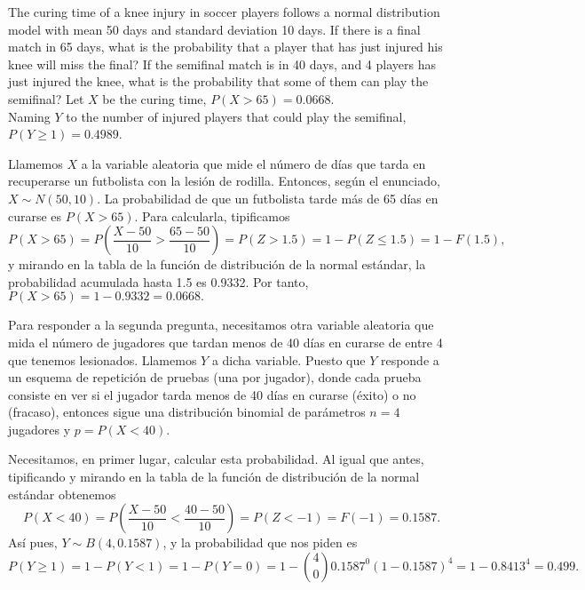 {The curing time of a knee injury in soccer players follows a normal distribution model with mean 50 days and standard deviation 10 days.
If there is a final match in 65 days, what is the probability that a player that has just injured his knee will miss the final?
If the semifinal match is in 40 days, and 4 players has just injured the knee, what is the probability that some of them can play the semifinal?
}
{Let $X$ be the curing time, $P(X>65)=0.0668$.\\
Naming $Y$ to the number of injured players that could play the semifinal, $P(Y\geq 1)=0.4989$.
}
{Llamemos $X$ a la variable aleatoria que mide el número de días que tarda en recuperarse un futbolista con la lesión de rodilla. Entonces,
según el enunciado, $X\sim N(50,10)$. La probabilidad de que un futbolista tarde más de 65 días en curarse es $P(X>65)$. Para calcularla, tipificamos
\[
P(X>65)=P(\frac{X-50}{10}>\frac{65-50}{10})=P(Z>1.5)=1-P(Z\leq 1.5)=1-F(1.5),
\]
y mirando en la tabla de la función de distribución de la normal estándar, la probabilidad acumulada hasta 1.5 es 0.9332. Por tanto,
$P(X>65)=1-0.9332=0.0668.$

Para responder a la segunda pregunta, necesitamos otra variable aleatoria que mida el número de jugadores que tardan menos de 40 días en
curarse de entre 4 que tenemos lesionados. Llamemos $Y$ a dicha variable. Puesto que $Y$ responde a un esquema de repetición de pruebas (una
por jugador), donde cada prueba consiste en ver si el jugador tarda menos de 40 días en curarse (éxito) o no (fracaso), entonces sigue una
distribución binomial de parámetros $n=4$ jugadores y $p=P(X<40)$.

Necesitamos, en primer lugar, calcular esta probabilidad. Al igual que antes, tipificando y mirando en la tabla de la función de
distribución de la normal estándar obtenemos
\[
P(X<40)=P(\frac{X-50}{10}<\frac{40-50}{10})=P(Z<-1)=F(-1)=0.1587.
\]
Así pues, $Y\sim B(4,0.1587)$, y la probabilidad que nos piden es
\[
P(Y\geq 1)=1-P(Y<1)=1-P(Y=0)=1-\binom{4}{0}0.1587^0 (1-0.1587)^4=1-0.8413^4=0.499.
\]
}


